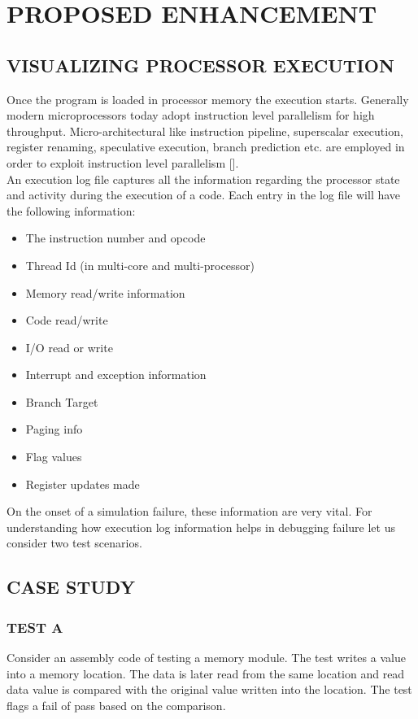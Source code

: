 \chapter{PROPOSED ENHANCEMENT}
\label{chap:enhancement.tex}

\section {VISUALIZING PROCESSOR EXECUTION}
Once the program is loaded in processor memory the execution starts. Generally modern microprocessors today adopt instruction level parallelism for high throughput. Micro-architectural like instruction pipeline, superscalar execution, register renaming, speculative execution, branch prediction etc. are employed in order to exploit instruction level parallelism [].  \\
An execution log file captures all the information regarding the processor state and activity during the execution of a code. Each entry in the log file will have the following information:
\begin{itemize}
	\item The instruction number and opcode
	\item Thread Id (in multi-core and multi-processor)
	\item Memory read/write information
	\item Code read/write
	\item I/O read or write
	\item Interrupt and exception information
	\item Branch Target
	\item Paging info
	\item Flag values
	\item Register updates made
\end{itemize}
On the onset of a simulation failure, these information are very vital. For understanding how execution log information helps in debugging failure let us consider two test scenarios.

\section {CASE STUDY}

\subsection {TEST A}
Consider an assembly code of testing a memory module. The test writes a value into a memory location. The data is later read from the same location and read data value is compared with the original value written into the location. The test flags a fail of pass based on the comparison.\\

